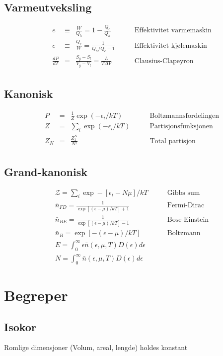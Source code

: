 \documentclass{article}
\begin{document}
\begin{multicols}{2}
\subsection*{Varmeutveksling}
$$\begin{aligned}
&e&\equiv&\frac{W}{Q_h}=1-\frac{Q_c}{Q_h}\qquad&\text{Effektivitet varmemaskin}\\
&e&\equiv&\frac{Q_c}{W}=\frac{1}{Q_h/Q_c-1}\qquad&\text{Effektivitet kj{\o}lemaskin}\\
&\frac{dP}{dT}&=&\frac{S_g-S_l}{V_g-V_l}=\frac{L}{T\Delta V}\qquad&\text{Clausius-Clapeyron}\\
\end{aligned}$$
\subsection*{Kanonisk}
$$\begin{aligned}
&P&=&\frac{1}{Z}\exp(-\epsilon_i/kT)\qquad&\text{Boltzmannsfordelingen}\\
&Z&=&\sum_i\exp(-\epsilon_i/kT)\qquad&\text{Partisjonsfunksjonen}\\
&Z_N&=&\frac{Z_1^N}{N!}\qquad&\text{Total partisjon}\\
\end{aligned}$$
\subsection*{Grand-kanonisk}
$$\begin{aligned}
&\mathcal{Z}=\sum_i \exp-[\epsilon_i-N\mu]/kT\qquad&\text{Gibbs sum}\\
&\bar{n}_{FD}=\frac{1}{\exp[(\epsilon-\mu)/kT]+1}\qquad&\text{Fermi-Dirac}\\
&\bar{n}_{BE}=\frac{1}{\exp[(\epsilon-\mu)/kT]-1}\qquad&\text{Bose-Einstein}\\
&\bar{n}_{B}=\exp[-(\epsilon-\mu)/kT]\qquad&\text{Boltzmann}\\
&E=\int_0^{\infty}\epsilon\bar{n}(\epsilon,\mu,T)D(\epsilon)d\epsilon\\
&N=\int_0^{\infty}\bar{n}(\epsilon,\mu,T)D(\epsilon)d\epsilon
\end{aligned}$$


\section*{Begreper}
\subsection*{Isokor}
Romlige dimensjoner (Volum, areal, lengde) holdes konstant

\end{multicols}
\end{document}
